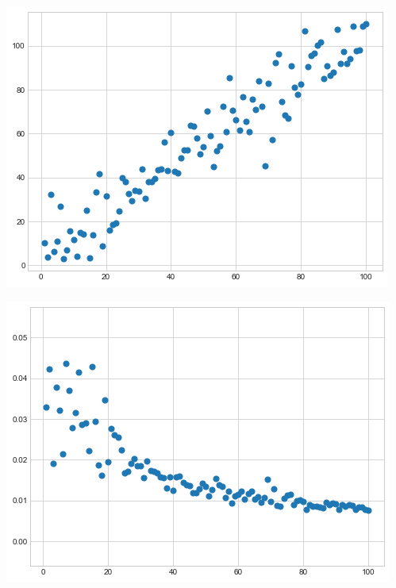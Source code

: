 \documentclass[12pt, a4paper, oneside]{article}
\begin{document}
\begin{minipage}[t]{0.45\textwidth}
	\includegraphics[scale=0.4]{regr_pic_1.png}
\end{minipage}
\hfill
\begin{minipage}[t]{0.45\textwidth}
	\includegraphics[scale=0.4]{regr_pic_2.png}
\end{minipage}
\end{document}
